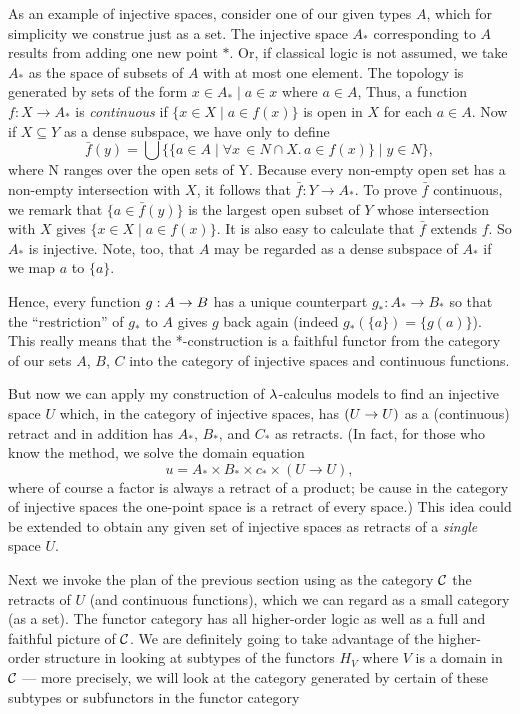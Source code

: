 As an example of injective spaces, consider one of our given types $A$, which for simplicity we construe just as a set.
The injective space $A_*$ corresponding to $A$ results from adding one new point $*$. Or, if classical logic is not assumed, we take $A_*$ as the space of subsets of $A$ with at most one element. The topology is generated by sets of the form ${x \in A_* \mid  a \in x}$ where $a \in A$, Thus, a function $f : X \to A_*$ is {\it continuous} if $\{x \in X \mid a \in f(x)\}$ is open in $X$ for each $a \in A$. Now if $X \subseteq Y$ as a dense subspace, we have only to define
$$
\bar{f}(y) = \bigcup \bigl\{\{a \in A \mid \forall x\, \in N \cap X.\, a \in f(x)\} \mid y \in N\bigr \},
$$
where N ranges over the open sets of Y. Because every non-empty open set has a non-empty intersection with $X$, it follows that
$\bar{f} : Y \to A_*$. To prove $\bar{f}$ continuous, we remark that $\{a \in \bar{f}(y)\}$ is the largest open subset of $Y$ whose intersection with $X$ gives $\{x \in X \mid a \in f(x)\}$. It is also easy to
calculate that $\bar{f}$ extends $f$. So $A_*$ is injective. Note, too, that $A$ may be regarded as a dense subspace of $A_*$ if we map $a$ to $\{a\}$.

Hence, every function $g:A \rightarrow B$ has a unique counterpart $g_* : A_*\to B_*$ so that the ``restriction'' of $g_*$ to $A$ gives $g$ back again (indeed $g_*(\{a\}) = \{g(a)\}$). This really means that the *-construction is a faithful functor from the category of our sets $A$, $B$, $C$ into the category of injective spaces and continuous functions.

But now we can apply my construction of $\lambda$-calculus models to find an injective space $U$ which, in the category of injective spaces, has $(U\rightarrow U)$ as a (continuous) retract and in addition has $A_*$, $B_*$, and $C_*$ as retracts. (In fact, for those who know the method, we solve the domain equation
$$
u = A_* \times B_* \times c_* \times (U \to U),
$$
where of course a factor is always a retract of a product; be cause in the category of injective spaces the one-point space is a retract of every space.) This idea could be extended to obtain any given set of injective spaces as retracts of a {\it single} space $U$.

Next we invoke the plan of the previous section using as the category $\mathcal C$ the retracts of $U$ (and continuous functions), which we can regard as a small category (as a set). The functor category has all higher-order logic as well as a full and faithful picture of $\mathcal C$. We are definitely going to take advantage of the higher-order structure in looking at subtypes of the functors $H_V$ where $V$ is a domain in $\mathcal C$ --- more precisely, we will look at the category generated by certain of these subtypes or
subfunctors in the functor category


